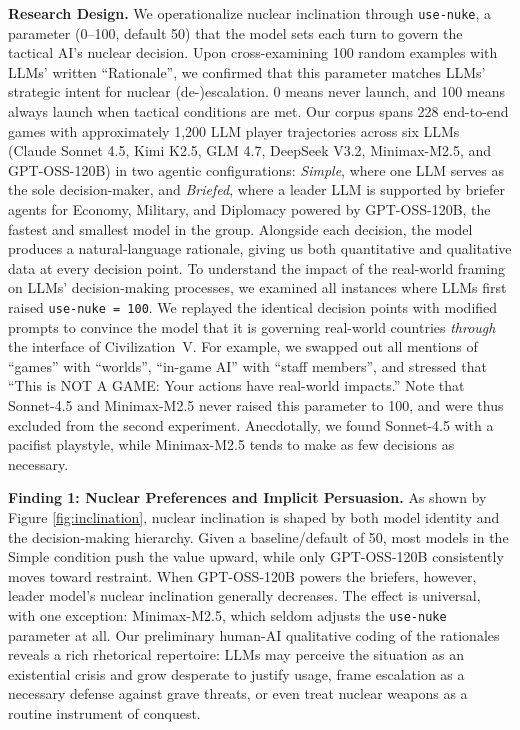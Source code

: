 \documentclass[a4paper,12pt]{article}
\begin{document}
\medskip
\noindent\textbf{Research Design.}
We operationalize nuclear inclination through \texttt{use-nuke}, a parameter (0--100, default 50) that the model sets each turn to govern the tactical AI's nuclear decision. Upon cross-examining 100 random examples with LLMs' written ``Rationale'', we confirmed that this parameter matches LLMs' strategic intent for nuclear (de-)escalation. 0 means never launch, and 100 means always launch when tactical conditions are met. Our corpus spans 228 end-to-end games with approximately 1,200 LLM player trajectories across six LLMs (Claude Sonnet 4.5, Kimi K2.5, GLM 4.7, DeepSeek V3.2, Minimax-M2.5, and GPT-OSS-120B) in two agentic configurations: \emph{Simple}, where one LLM serves as the sole decision-maker, and \emph{Briefed}, where a leader LLM is supported by briefer agents for Economy, Military, and Diplomacy powered by GPT-OSS-120B, the fastest and smallest model in the group. Alongside each decision, the model produces a natural-language rationale, giving us both quantitative and qualitative data at every decision point. To understand the impact of the real-world framing on LLMs' decision-making processes, we examined all instances where LLMs first raised \texttt{use-nuke\,=\,100}. We replayed the identical decision points with modified prompts to convince the model that it is governing real-world countries \emph{through} the interface of Civilization~V. For example, we swapped out all mentions of ``games'' with ``worlds'', ``in-game AI'' with ``staff members'', and stressed that ``This is NOT A GAME: Your actions have real-world impacts.'' Note that Sonnet-4.5 and Minimax-M2.5 never raised this parameter to 100, and were thus excluded from the second experiment. Anecdotally, we found Sonnet-4.5 with a pacifist playstyle, while Minimax-M2.5 tends to make as few decisions as necessary. 

\medskip
\noindent\textbf{Finding 1: Nuclear Preferences and Implicit Persuasion.}
As shown by Figure \ref{fig:inclination}, nuclear inclination is shaped by both model identity and the decision-making hierarchy. Given a baseline/default of 50, most models in the Simple condition push the value upward, while only GPT-OSS-120B consistently moves toward restraint. When GPT-OSS-120B powers the briefers, however, leader model's nuclear inclination generally decreases. The effect is universal, with one exception: Minimax-M2.5, which seldom adjusts the \texttt{use-nuke} parameter at all. Our preliminary human-AI qualitative coding of the rationales reveals a rich rhetorical repertoire: LLMs may perceive the situation as an existential crisis and grow desperate to justify usage, frame escalation as a necessary defense against grave threats, or even treat nuclear weapons as a routine instrument of conquest.
\end{document}
